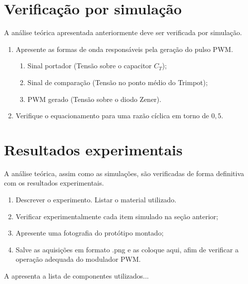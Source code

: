 \section{Verificação por simulação}


A análise teórica apresentada anteriormente deve ser verificada por simulação. 
 
\begin{enumerate}									
	\item   Apresente as formas de onda responsáveis pela geração do pulso PWM.
	\begin{enumerate}
		\item Sinal portador (Tensão sobre o capacitor $C_T$);
		\item Sinal de comparação (Tensão no ponto médio do Trimpot);
		\item PWM gerado (Tensão sobre o diodo Zener).
	\end{enumerate}
	\item  Verifique o equacionamento para uma razão cíclica em torno de $0,5$.
\end{enumerate}





\section{Resultados experimentais}


A análise teórica, assim como as simulações, são verificadas de forma definitiva com os resultados experimentais.
\begin{enumerate}									
	\item   Descrever o experimento. Listar o material utilizado.  
	\item  Verificar experimentalmente cada item simulado na seção anterior;
	\item  Apresente uma fotografia do protótipo montado;
	\item  Salve as aquisições em formato .png e as coloque aqui, afim de verificar a operação adequada do modulador PWM.
\end{enumerate}

A  apresenta a lista de componentes utilizados...

